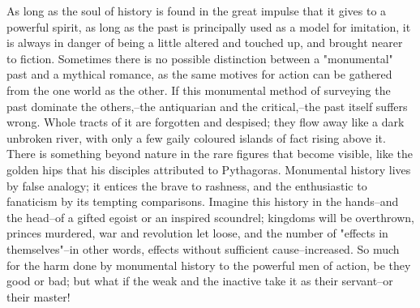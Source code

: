 As long as the soul of history is found in the great impulse that it
gives to a powerful spirit, as long as the past is principally used
as a model for imitation, it is always in danger of being a little
altered and touched up, and brought nearer to fiction. Sometimes
there is no possible distinction between a "monumental" past and a
mythical romance, as the same motives for action can be gathered from
the one world as the other. If this monumental method of surveying
the past dominate the others,--the antiquarian and the critical,--the
past itself suffers wrong. Whole tracts of it are forgotten and
despised; they flow away like a dark unbroken river, with only a few
gaily coloured islands of fact rising above it. There is something
beyond nature in the rare figures that become visible, like the
golden hips that his disciples attributed to Pythagoras. Monumental
history lives by false analogy; it entices the brave to rashness, and
the enthusiastic to fanaticism by its tempting comparisons. Imagine
this history in the hands--and the head--of a gifted egoist or an
inspired scoundrel; kingdoms will be overthrown, princes murdered,
war and revolution let loose, and the number of "effects in
themselves"--in other words, effects without sufficient
cause--increased. So much for the harm done by monumental history to
the powerful men of action, be they good or bad; but what if the weak
and the inactive take it as their servant--or their master!

